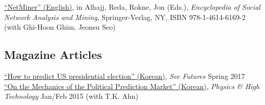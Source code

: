 \documentclass[11pt, a4paper]{article} %
\newcommand{\years}[1]{\marginnote{\scriptsize #1}} %
\begin{document}
\years{2014} \href{http://www.springer.com/us/book/9781461461692}{``NetMiner'' (English)}, in Alhajj, Reda, Rokne, Jon (Eds.), \textit{Encyclopedia of Social Network Analysis and Mining}, Springer-Verlag, NY, ISBN 978-1-4614-6169-2 (with Ghi-Hoon Ghim, Jeonsu Seo)\\


\subsection*{Magazine Articles}

\years{2017}
\href{http://futures.kaist.ac.kr/center05/periodical/view/tableid/periodical/id/384}{``How to predict US presidential election'' (Korean)}, \emph{See Futures} Spring 2017\\
\years{2015} \href{http://webzine.kps.or.kr/contents/data/webzine/webzine/14762088365.pdf}{``On the Mechanics of the Political Prediction Market'' (Korean)}, \emph{Physics \& High Technology} Jan/Feb 2015 (with T.K. Ahn)\\
\end{document}
